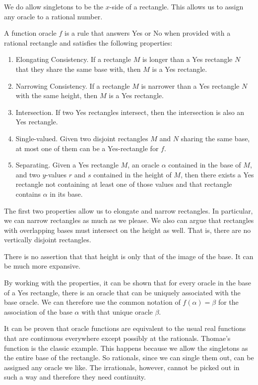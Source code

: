 \documentclass[12pt]{article}
\theoremstyle{remark}
\begin{document}
We do allow singletons to be the $x$-side of a rectangle. This allows us to assign any oracle to a rational number. 

A function oracle $f$ is a rule that answers Yes or No when provided with a rational rectangle and satisfies the following properties: 
\begin{enumerate}
    \item Elongating Consistency. If a rectangle $M$ is longer than a Yes rectangle $N$ that they share the same base with, then $M$ is a Yes rectangle. 
    \item Narrowing Consistency. If a rectangle $M$ is narrower than a Yes rectangle $N$ with the same height, then $M$ is a Yes rectangle.  
    \item Intersection. If two Yes rectangles intersect, then the intersection is also an Yes rectangle. 
    \item Single-valued. Given two disjoint rectangles $M$ and $N$ sharing the same base, at most one of them can be a Yes-rectangle for $f$. 
    \item Separating. Given a Yes rectangle $M$, an oracle $\alpha$ contained in the base of $M$, and two $y$-values $r$ and $s$ contained in the height of $M$, then there exists a Yes rectangle not containing at least one of those values and that rectangle contains $\alpha$ in its base.
\end{enumerate} 

The first two properties allow us to elongate and narrow rectangles. In particular, we can narrow rectangles as much as we please. We also can argue that rectangles with overlapping bases must intersect on the height as well. That is, there are no vertically disjoint rectangles. 

There is no assertion that that height is only that of the image of the base. It can be much more expansive. 

By working with the properties, it can be shown that for every oracle in the base of a Yes rectangle, there is an oracle that can be uniquely associated with the base oracle. We can therefore use the common notation of $f(\alpha) = \beta$ for the association of the base $\alpha$ with that unique oracle $\beta$.

It can be proven that oracle functions are equivalent to the usual real functions that are continuous everywhere except possibly at the rationals. Thomae's function is the classic example. This happens because we allow the singletons as the entire base of the rectangle. So rationals, since we can single them out, can be assigned any oracle we like. The irrationals, however, cannot be picked out in such a way and therefore they need continuity.
\end{document}
